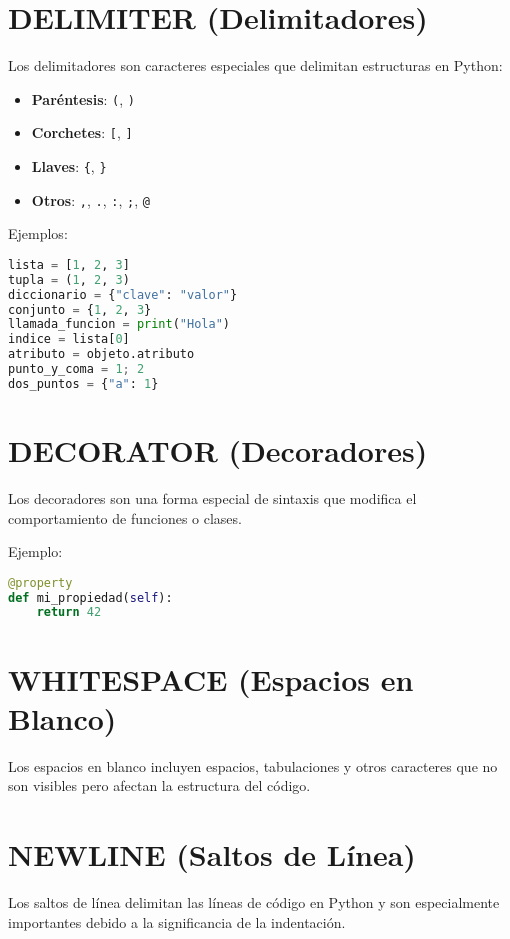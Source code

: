 \documentclass[12pt,letterpaper]{report}
\begin{document}
\section{DELIMITER (Delimitadores)}

Los delimitadores son caracteres especiales que delimitan estructuras en Python:

\begin{itemize}
    \item \textbf{Paréntesis}: \texttt{(}, \texttt{)}
    \item \textbf{Corchetes}: \texttt{[}, \texttt{]}
    \item \textbf{Llaves}: \texttt{\{}, \texttt{\}}
    \item \textbf{Otros}: \texttt{,}, \texttt{.}, \texttt{:}, \texttt{;}, \texttt{@}
\end{itemize}

Ejemplos:
\begin{lstlisting}[language=Python]
lista = [1, 2, 3]
tupla = (1, 2, 3)
diccionario = {"clave": "valor"}
conjunto = {1, 2, 3}
llamada_funcion = print("Hola")
indice = lista[0]
atributo = objeto.atributo
punto_y_coma = 1; 2
dos_puntos = {"a": 1}
\end{lstlisting}

\section{DECORATOR (Decoradores)}

Los decoradores son una forma especial de sintaxis que modifica el comportamiento de funciones o clases.

Ejemplo:
\begin{lstlisting}[language=Python]
@property
def mi_propiedad(self):
    return 42
\end{lstlisting}

\section{WHITESPACE (Espacios en Blanco)}

Los espacios en blanco incluyen espacios, tabulaciones y otros caracteres que no son visibles pero afectan la estructura del código.

\section{NEWLINE (Saltos de Línea)}

Los saltos de línea delimitan las líneas de código en Python y son especialmente importantes debido a la significancia de la indentación.
\end{document}
